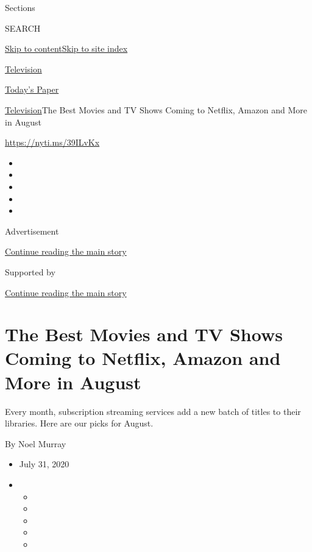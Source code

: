 Sections

SEARCH

\protect\hyperlink{site-content}{Skip to
content}\protect\hyperlink{site-index}{Skip to site index}

\href{https://www.nytimes3xbfgragh.onion/section/arts/television}{Television}

\href{https://myaccount.nytimes3xbfgragh.onion/auth/login?response_type=cookie\&client_id=vi}{}

\href{https://www.nytimes3xbfgragh.onion/section/todayspaper}{Today's
Paper}

\href{/section/arts/television}{Television}\textbar{}The Best Movies and
TV Shows Coming to Netflix, Amazon and More in August

\url{https://nyti.ms/39ILvKx}

\begin{itemize}
\item
\item
\item
\item
\item
\end{itemize}

Advertisement

\protect\hyperlink{after-top}{Continue reading the main story}

Supported by

\protect\hyperlink{after-sponsor}{Continue reading the main story}

\hypertarget{the-best-movies-and-tv-shows-coming-to-netflix-amazon-and-more-in-august}{%
\section{The Best Movies and TV Shows Coming to Netflix, Amazon and More
in
August}\label{the-best-movies-and-tv-shows-coming-to-netflix-amazon-and-more-in-august}}

Every month, subscription streaming services add a new batch of titles
to their libraries. Here are our picks for August.

By Noel Murray

\begin{itemize}
\item
  July 31, 2020
\item
  \begin{itemize}
  \item
  \item
  \item
  \item
  \item
  \end{itemize}
\end{itemize}

